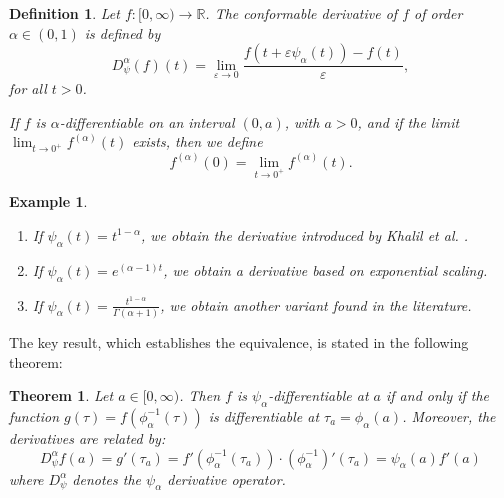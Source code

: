 \documentclass[preprint,12pt]{elsarticle}
\newtheorem{theorem}{Theorem}
\newtheorem{definition}{Definition}
\newtheorem{example}{Example}
\begin{document}
\begin{definition} Let \( f : [0, \infty) \to \mathbb{R} \). The conformable derivative of \( f \) of order \( \alpha \in (0,1) \) is defined by
\[
D_{\psi}^{\alpha}(f)(t) = \lim_{\varepsilon \to 0} \frac{f(t + \varepsilon \psi_{\alpha}(t)) - f(t)}{\varepsilon},
\]
for all \( t > 0 \).

If \( f \) is \( \alpha \)-differentiable on an interval \( (0, a) \), with \( a > 0 \), and if the limit \( \lim_{t \to 0^+} f^{(\alpha)}(t) \) exists, then we define
\[
f^{(\alpha)}(0) = \lim_{t \to 0^+} f^{(\alpha)}(t).
\]
\end{definition}

\begin{example}
\begin{enumerate}
\item If \(\psi_{\alpha}(t) = t^{1-\alpha}\), we obtain the derivative introduced by Khalil et al. \cite{3}.
\item If \(\psi_{\alpha}(t) = e^{(\alpha - 1)t}\), we obtain a derivative based on exponential scaling.
\item If \(\psi_{\alpha}(t) = \frac{t^{1-\alpha}}{\Gamma(\alpha+1)}\), we obtain another variant found in the literature.
\end{enumerate}
\end{example}

The key result, which establishes the equivalence, is stated in the following theorem:

\begin{theorem}\label{1} Let \( a \in [0, \infty) \). Then \( f \) is \( \psi_{\alpha} \)-differentiable at \( a \) if and only if the function \( g(\tau) = f(\phi_{\alpha}^{-1}(\tau)) \) is differentiable at \( \tau_a = \phi_{\alpha}(a) \). Moreover, the derivatives are related by:
\[
D^{\alpha}_{\psi} f(a) = g'(\tau_a) = f'(\phi_\alpha^{-1}(\tau_a)) \cdot (\phi_{\alpha}^{-1})'(\tau_a) = \psi_{\alpha}(a) f'(a)
\]
where $D^{\alpha}_{\psi}$ denotes the $\psi_\alpha$ derivative operator.
\end{theorem}
\end{document}
